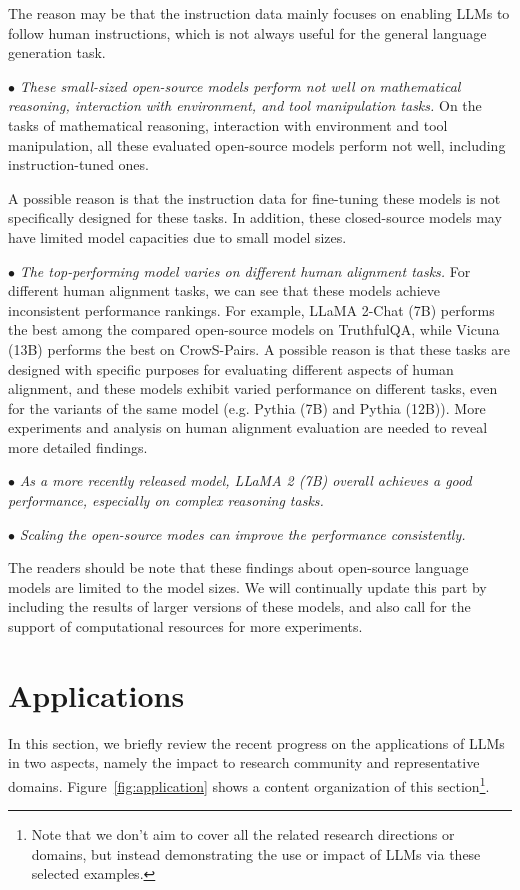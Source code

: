 {{{The reason may be that the instruction data mainly focuses on enabling LLMs to follow human instructions, which is not always useful  for the general language generation task. }

$\bullet$ \emph{These small-sized open-source models perform not well on {mathematical reasoning, interaction with environment, and tool manipulation tasks.}} On the tasks of mathematical reasoning, interaction with environment and tool manipulation, all these evaluated open-source models perform not well, including instruction-tuned ones. 

A possible reason is that the instruction data for fine-tuning these models is not specifically designed for these tasks. In addition, these closed-source models may have limited model capacities due to small model sizes.     

$\bullet$ \emph{The top-performing model varies on different human alignment tasks.} For different human alignment tasks, we can see that these models achieve inconsistent performance rankings. For example, LLaMA 2-Chat (7B) performs the best among the compared open-source models on TruthfulQA, while Vicuna (13B) performs the best on CrowS-Pairs. A possible reason is that these tasks are designed with specific purposes for evaluating different aspects of human alignment, and these models exhibit varied performance on different tasks, even for the variants of the same model (e.g. Pythia (7B) and Pythia (12B)). More experiments and analysis on human alignment evaluation are needed to reveal more detailed findings.  

$\bullet$ \emph{As a more recently released model, LLaMA 2 (7B) overall achieves a good  performance, especially on complex reasoning tasks.} 

$\bullet$ \emph{Scaling the open-source modes can improve the performance consistently.} 

The readers should be note that these findings about open-source language models are  limited to the model sizes. We will continually update this part by including the results of larger versions of these models, and also call for the support of computational resources for more experiments. 

\section{Applications}\label{sec-application}

{In this section, we briefly review the recent progress on the applications of LLMs in two aspects, namely the impact to research community and representative domains.}
Figure~\ref{fig:application} shows a content organization of this section\footnote{Note that we don't aim to cover all the related research directions or domains, but instead demonstrating the use or impact of LLMs via these selected examples. }. 

}}
